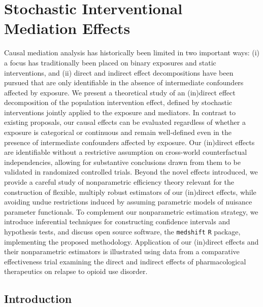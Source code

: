 \chapter{Stochastic Interventional Mediation Effects}\label{three}

Causal mediation analysis has historically been limited in two important ways:
(i) a focus has traditionally been placed on binary exposures and static
interventions, and (ii) direct and indirect effect decompositions have been
pursued that are only identifiable in the absence of intermediate confounders
affected by exposure. We present a theoretical study of an (in)direct effect
decomposition of the population intervention effect, defined by stochastic
interventions jointly applied to the exposure and mediators. In contrast to
existing proposals, our causal effects can be evaluated regardless of whether
a exposure is categorical or continuous and remain well-defined even in the
presence of intermediate confounders affected by exposure. Our (in)direct
effects are identifiable without a restrictive assumption on cross-world
counterfactual independencies, allowing for substantive conclusions drawn from
them to be validated in randomized controlled trials. Beyond the novel effects
introduced, we provide a careful study of nonparametric efficiency theory
relevant for the construction of flexible, multiply robust estimators of our
(in)direct effects, while avoiding undue restrictions induced by assuming
parametric models of nuisance parameter functionals. To complement our
nonparametric estimation strategy, we introduce inferential techniques for
constructing confidence intervals and hypothesis tests, and discuss open source
software, the \texttt{medshift} \texttt{R} package, implementing the proposed
methodology. Application of our (in)direct effects and their nonparametric
estimators is illustrated using data from a comparative effectiveness trial
examining the direct and indirect effects of pharmacological therapeutics on
relapse to opioid use disorder.

\section{Introduction}\label{sec:intro}

